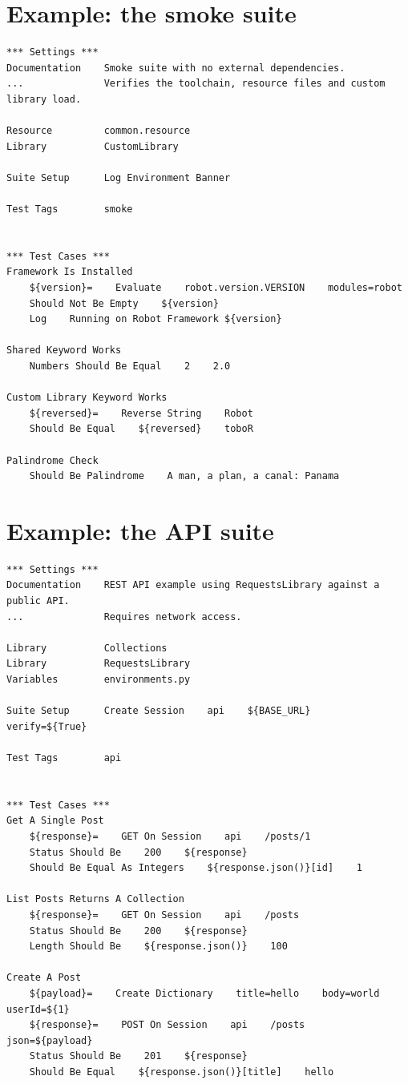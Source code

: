 \documentclass[a4paper,12pt]{article}
\begin{document}
\appendix

\section{Example: the smoke suite}
\label{sec:smoke}

\begin{lstlisting}
*** Settings ***
Documentation    Smoke suite with no external dependencies.
...              Verifies the toolchain, resource files and custom library load.

Resource         common.resource
Library          CustomLibrary

Suite Setup      Log Environment Banner

Test Tags        smoke


*** Test Cases ***
Framework Is Installed
    ${version}=    Evaluate    robot.version.VERSION    modules=robot
    Should Not Be Empty    ${version}
    Log    Running on Robot Framework ${version}

Shared Keyword Works
    Numbers Should Be Equal    2    2.0

Custom Library Keyword Works
    ${reversed}=    Reverse String    Robot
    Should Be Equal    ${reversed}    toboR

Palindrome Check
    Should Be Palindrome    A man, a plan, a canal: Panama
\end{lstlisting}

\section{Example: the API suite}

\begin{lstlisting}
*** Settings ***
Documentation    REST API example using RequestsLibrary against a public API.
...              Requires network access.

Library          Collections
Library          RequestsLibrary
Variables        environments.py

Suite Setup      Create Session    api    ${BASE_URL}    verify=${True}

Test Tags        api


*** Test Cases ***
Get A Single Post
    ${response}=    GET On Session    api    /posts/1
    Status Should Be    200    ${response}
    Should Be Equal As Integers    ${response.json()}[id]    1

List Posts Returns A Collection
    ${response}=    GET On Session    api    /posts
    Status Should Be    200    ${response}
    Length Should Be    ${response.json()}    100

Create A Post
    ${payload}=    Create Dictionary    title=hello    body=world    userId=${1}
    ${response}=    POST On Session    api    /posts    json=${payload}
    Status Should Be    201    ${response}
    Should Be Equal    ${response.json()}[title]    hello
\end{lstlisting}
\end{document}
